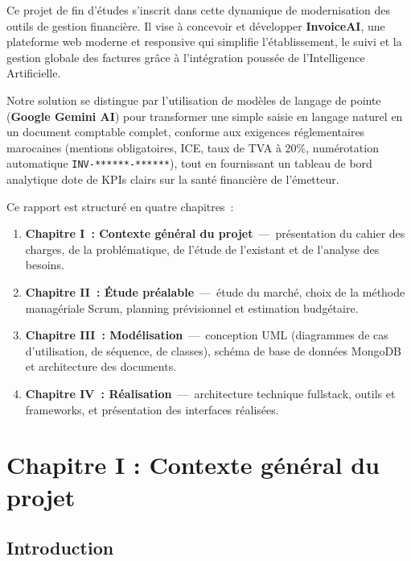 \documentclass[a4paper,12pt]{extarticle}
\begin{document}
Ce projet de fin d'études s'inscrit dans cette dynamique de modernisation des outils de gestion financière. Il vise à concevoir et développer \textbf{InvoiceAI}, une plateforme web moderne et responsive qui simplifie l'établissement, le suivi et la gestion globale des factures grâce à l'intégration poussée de l'Intelligence Artificielle.

Notre solution se distingue par l'utilisation de modèles de langage de pointe (\textbf{Google Gemini AI}) pour transformer une simple saisie en langage naturel en un document comptable complet, conforme aux exigences réglementaires marocaines (mentions obligatoires, ICE, taux de TVA à 20\%, numérotation automatique \texttt{INV-******-******}), tout en fournissant un tableau de bord analytique dote de KPIs clairs sur la santé financière de l'émetteur.

Ce rapport est structuré en quatre chapitres~:

\begin{enumerate}[leftmargin=2cm]
  \item \textbf{Chapitre I~: Contexte général du projet}~---~présentation du cahier des charges, de la problématique, de l'étude de l'existant et de l'analyse des besoins.
  \item \textbf{Chapitre II~: Étude préalable}~---~étude du marché, choix de la méthode managériale Scrum, planning prévisionnel et estimation budgétaire.
  \item \textbf{Chapitre III~: Modélisation}~---~conception UML (diagrammes de cas d'utilisation, de séquence, de classes), schéma de base de données MongoDB et architecture des documents.
  \item \textbf{Chapitre IV~: Réalisation}~---~architecture technique fullstack, outils et frameworks, et présentation des interfaces réalisées.
\end{enumerate}

\newpage
\section{Chapitre I : Contexte général du projet}

\subsection*{Introduction}
{}
\end{document}

